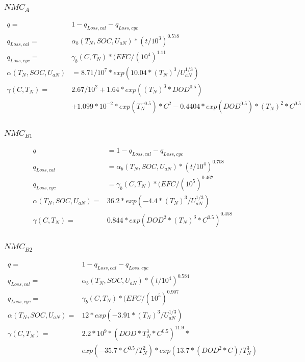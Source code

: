 \documentclass[11pt,preprint]{elsarticle}
\begin{document}
\subsubsection{$NMC_A$}
\begin{align}
    q =& 1- q_{Loss,cal} - q_{Loss,cyc}\\
    q_{Loss,cal} =& \alpha_b(T_N,SOC,U_{aN}) * (t/10^3)^0.578\\
    q_{Loss,cyc} =& \gamma_b(C,T_N) * (EFC/(10^4)^1.11\\
    \alpha(T_N,SOC,U_{aN})& = 8.71/10^7 * exp(10.04* (T_N)^3/ U_{aN}^{1/3})\\
    \gamma(C,T_N) =& 2.67/10^2 +  1.64 * exp((T_N)^3*DOD^0.5) \\ &+1.099*10^{-2}*exp(T_N^{-0.5})*C^2 - 0.4404*exp(DOD^0.5)*(T_N)^2*C^0.5\\
\end{align}
\subsubsection{$NMC_{B1}$}
\begin{align}
    q& = 1- q_{Loss,cal} - q_{Loss,cyc}\\
    q_{Loss,cal}& = \alpha_b(T_N,SOC,U_{aN}) * (t/10^4)^0.708\\
    q_{Loss,cyc}& = \gamma_b(C,T_N) * (EFC/(10^5)^0.467\\
    \alpha(T_N,SOC,U_{aN})=& 36.2 * exp(-4.4* (T_N)^3/ U_{aN}^{1/3})\\
    \gamma(C,T_N) =& 0.844 * exp(DOD^2*(T_N)^3*C^0.5)^0.458\\
\end{align}
\subsubsection{$NMC_{B2}$}
\begin{align}
    q =& 1- q_{Loss,cal} - q_{Loss,cyc}\\
    q_{Loss,cal} =& \alpha_b(T_N,SOC,U_{aN}) * (t/10^4)^0.584\\
    q_{Loss,cyc} =& \gamma_b(C,T_N) * (EFC/(10^5)^0.907\\
    \alpha(T_N,SOC,U_{aN}) =& 12 * exp(-3.91* (T_N)^3/ U_{aN}^{1/3})\\
    \gamma(C,T_N) =& 2.2*10^9*(DOD*T_N^3*C^0.5)^11.9 * \\
    &exp(-35.7*C^0.5/T_N^2) * exp(13.7*(DOD^2*C)/T_N^3)
\end{align}
\newpage

\end{document}
